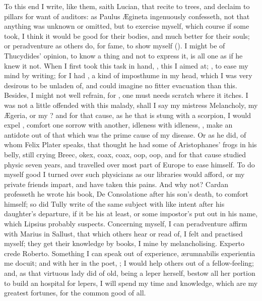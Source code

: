 {To this end I write, like them, saith Lucian, that recite to trees, and
declaim to pillars for want of auditors: as Paulus \AE{}gineta
ingenuously confesseth, not that anything was unknown or omitted, but
to exercise myself, which course if some took, I think it would be good
for their bodies, and much better for their souls; or peradventure as
others do, for fame, to show myself (). I might be of Thucydides' opinion, to know
a thing and not to express it, is all one as if he knew it not. When I
first took this task in hand, , this I aimed at; ,
to ease my mind by writing; for I had , a
kind of imposthume in my head, which I was very desirous to be unladen
of, and could imagine no fitter evacuation than this. Besides, I might
not well refrain, for , one must needs scratch
where it itches. I was not a little offended with this malady, shall I
say my mistress Melancholy, my \AE{}geria, or my ? and for
that cause, as he that is stung with a scorpion, I would expel , comfort one sorrow with another, idleness with idleness, , make an antidote out of that which was the prime
cause of my disease. Or as he did, of whom Felix Plater speaks,
that thought he had some of Aristophanes' frogs in his belly, still
crying Breec, okex, coax, coax, oop, oop, and for that cause studied
physic seven years, and travelled over most part of Europe to ease
himself. To do myself good I turned over such physicians as our
libraries would afford, or my private friends impart, and have
taken this pains. And why not? Cardan professeth he wrote his book, De
Consolatione after his son's death, to comfort himself; so did Tully
write of the same subject with like intent after his daughter's
departure, if it be his at least, or some impostor's put out in his
name, which Lipsius probably suspects. Concerning myself, I can
peradventure affirm with Marius in Sallust, that which others hear
or read of, I felt and practised myself; they get their knowledge by
books, I mine by melancholising. Experto crede Roberto. Something I can
speak out of experience, \ae{}rumnabilis experientia me docuit; and with
her in the poet, ; I would
help others out of a fellow-feeling; and, as that virtuous lady did of
old, being a leper herself, bestow all her portion to build an
hospital for lepers, I will spend my time and knowledge, which are my
greatest fortunes, for the common good of all.

}

